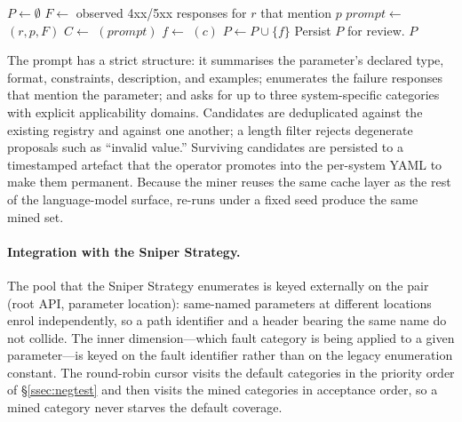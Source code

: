 \documentclass[conference]{IEEEtran}
\begin{document}
\begin{algorithm}[t]
\caption{Mining system-specific fault categories.}\label{alg:miner}
\footnotesize
\begin{algorithmic}[1]
\Require{}
\Ensure{}
\State $P \gets \emptyset$
    \State $F \gets$ observed 4xx/5xx responses for $r$ that mention $p$
    \State $\mathit{prompt} \gets$ $(r, p, F)$
    \State $C \gets$ $(\mathit{prompt})$ 
      \State $f \gets$ $(c)$
        \State $P \gets P \cup \{f\}$
      \EndIf
    \EndFor
  \EndFor
\EndFor
\State Persist $P$ for review.
\State \Return $P$
\end{algorithmic}
\end{algorithm}

\noindent The prompt has a strict structure: it summarises the parameter's declared type, format, constraints, description, and examples; enumerates the failure responses that mention the parameter; and asks for up to three system-specific categories with explicit applicability domains. Candidates are deduplicated against the existing registry and against one another; a length filter rejects degenerate proposals such as ``invalid value.'' Surviving candidates are persisted to a timestamped artefact that the operator promotes into the per-system YAML to make them permanent. Because the miner reuses the same cache layer as the rest of the language-model surface, re-runs under a fixed seed produce the same mined set.

\paragraph{Integration with the Sniper Strategy.}
The pool that the Sniper Strategy enumerates is keyed externally on the pair (root API, parameter location): same-named parameters at different locations enrol independently, so a path identifier and a header bearing the same name do not collide. The inner dimension---which fault category is being applied to a given parameter---is keyed on the fault identifier rather than on the legacy enumeration constant. The round-robin cursor visits the default categories in the priority order of \S\ref{ssec:negtest} and then visits the mined categories in acceptance order, so a mined category never starves the default coverage.
\end{document}
